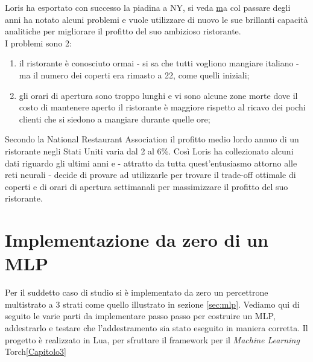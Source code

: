 Loris ha esportato con successo la piadina a NY, si veda \parencite{WGradisca} \href{www.gradiscanyc.com} ma col passare degli anni ha notato alcuni problemi e vuole utilizzare di nuovo le sue brillanti capacità analitiche per migliorare il profitto del suo ambizioso ristorante. \\
I problemi sono 2: 
\begin{enumerate}
\item il ristorante è conosciuto ormai - si sa che tutti vogliono mangiare italiano - ma il numero dei coperti era rimasto a 22, come quelli iniziali; 
\item gli orari di apertura sono troppo lunghi e vi sono alcune zone morte dove il costo di mantenere aperto il ristorante è maggiore rispetto al ricavo dei pochi clienti che si siedono a mangiare durante quelle ore; 
\end{enumerate}
Secondo la National Restaurant Association\parencite{WProfit} \parencite{WRRG} il profitto medio lordo annuo di un ristorante negli Stati Uniti varia dal 2 al 6\%. Così Loris ha collezionato alcuni dati riguardo gli ultimi anni e - attratto da tutta quest'entusiasmo attorno alle reti neurali - decide di provare ad utilizzarle per trovare il trade-off ottimale di coperti e di orari di apertura settimanali per massimizzare il profitto del suo ristorante. 


\section{Implementazione da zero di un MLP}
Per il suddetto caso di studio si è implementato da zero un percettrone multistrato a 3 strati come quello illustrato in sezione \ref{sec:mlp}. Vediamo qui di seguito le varie parti da implementare passo passo per costruire un MLP, addestrarlo e testare che l'addestramento sia stato eseguito in maniera corretta. Il progetto è realizzato in Lua, per sfruttare il framework per il \emph{Machine Learning} Torch\ref{Capitolo3}
